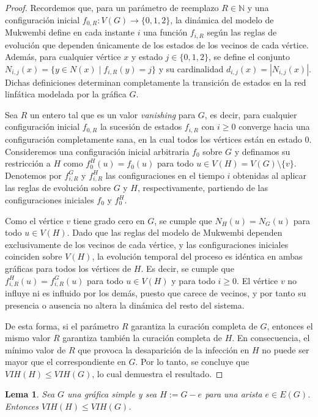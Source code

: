 \documentclass[12pt,titlepage,twoside,openright]{book}
\newtheorem{lemma}{Lema}[section]
\begin{document}
\begin{proof}
    Recordemos que, para un par\'ametro de reemplazo $R \in \mathbb{N}$ y una configuraci\'on inicial $f_{0,R}: V(G) \rightarrow \{0,1,2\}$, la din\'amica del modelo de Mukwembi define en cada instante $i$ una funci\'on $f_{i,R}$ seg\'un las reglas de evoluci\'on que dependen \'unicamente de los estados de los vecinos de cada v\'ertice. Adem\'as, para cualquier v\'ertice $x$ y estado $j \in \{0,1,2\}$, se define el conjunto $N_{i,j}(x)=\{y \in N(x) \mid f_{i,R}(y)=j\}$ y su cardinalidad $d_{i,j}(x)=|N_{i,j}(x)|$. Dichas definiciones determinan completamente la transici\'on de estados en la red linf\'atica modelada por la gr\'afica $G$.

    Sea $R$ un entero tal que es un valor \emph{vanishing} para $G$, es decir, para cualquier configuraci\'on inicial $f_{0,R}$ la sucesi\'on de estados $f_{i,R}$ con $i\geq0$ converge hacia una configuraci\'on completamente sana, en la cual todos los v\'ertices est\'an en estado $0$. Consideremos una configuraci\'on inicial arbitraria $f_0$ sobre $G$ y definamos su restricci\'on a $H$ como $f_0^H(u)=f_0(u)$ para todo $u \in V(H)=V(G)\setminus\{v\}$. Denotemos por $f_{i,R}^G$ y $f_{i,R}^H$ las configuraciones en el tiempo $i$ obtenidas al aplicar las reglas de evoluci\'on sobre $G$ y $H$, respectivamente, partiendo de las configuraciones iniciales $f_0$ y $f_0^H$.

    Como el v\'ertice $v$ tiene grado cero en $G$, se cumple que $N_H(u)=N_G(u)$ para todo $u \in V(H)$. Dado que las reglas del modelo de Mukwembi dependen exclusivamente de los vecinos de cada v\'ertice, y las configuraciones iniciales coinciden sobre $V(H)$, la evoluci\'on temporal del proceso es id\'entica en ambas gr\'aficas para todos los v\'ertices de $H$. Es decir, se cumple que $f_{i,R}^H(u)=f_{i,R}^G(u)$ para todo $u \in V(H)$ y para todo $i \geq 0$. El v\'ertice $v$ no influye ni es influido por los dem\'as, puesto que carece de vecinos, y por tanto su presencia o ausencia no altera la din\'amica del resto del sistema.

    De esta forma, si el par\'ametro $R$ garantiza la curaci\'on completa de $G$, entonces el mismo valor $R$ garantiza tambi\'en la curaci\'on completa de $H$. En consecuencia, el m\'inimo valor de $R$ que provoca la desaparici\'on de la infecci\'on en $H$ no puede ser mayor que el correspondiente en $G$. Por lo tanto, se concluye que $VIH(H) \leq VIH(G)$, lo cual demuestra el resultado.
\end{proof}
\begin{lemma}\label{Lem:BorrarAristas}
    Sea $G$ una gr\'afica simple y sea $H:=G-e$ para una arista $e\in E(G)$. Entonces $VIH(H)\leq VIH(G)$.
\end{lemma}
\end{document}
